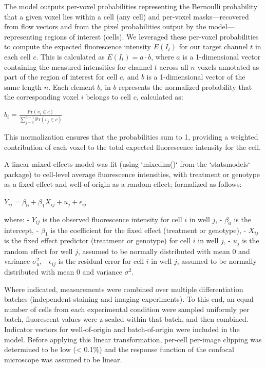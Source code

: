 \documentclass[12pt]{article}
\begin{document}
The model outputs per-voxel probabilities representing the Bernoulli probability that a given voxel lies within a cell (any cell) and per-voxel masks—recovered from flow vectors and from the pixel probabilities output by the model—representing regions of interest (cells). We leveraged these per-voxel probabilities to compute the expected fluorescence intensity $E(I_t)$ for our target channel $t$ in each cell $c$. This is calculated as $E(I_t) = a \cdot b$, where $a$ is a 1-dimensional vector containing the measured intensities for channel $t$ across all $n$ voxels annotated as part of the region of interest for cell $c$, and $b$ is a 1-dimensional vector of the same length $n$. Each element $b_i$ in $b$ represents the normalized probability that the corresponding voxel $i$ belongs to cell $c$, calculated as:

$b_i = \frac{\text{Pr}(v_i \in c)}{\sum_{j=0}^{n-1} \text{Pr}(v_j \in c)}$

This normalization ensures that the probabilities sum to 1, providing a weighted contribution of each voxel to the total expected fluorescence intensity for the cell.

A linear mixed-effects model was fit (using `mixedlm()` from the `statsmodels` package) to cell-level average fluorescence intensities, with treatment or genotype as a fixed effect and well-of-origin as a random effect; formalized as follows:

$ Y_{ij} = \beta_0 + \beta_1 X_{ij} + u_j + \epsilon_{ij} $

where:
- $Y_{ij}$ is the observed fluorescence intensity for cell $i$ in well $j$,
- $\beta_0$ is the intercept,
- $\beta_1$ is the coefficient for the fixed effect (treatment or genotype),
- $X_{ij}$ is the fixed effect predictor (treatment or genotype) for cell $i$ in well $j$,
- $u_j$ is the random effect for well $j$, assumed to be normally distributed with mean 0 and variance $\sigma_u^2$,
- $\epsilon_{ij}$ is the residual error for cell $i$ in well $j$, assumed to be normally distributed with mean 0 and variance $\sigma^2$.

Where indicated, measurements were combined over multiple differentiation batches (independent staining and imaging experiments). To this end, an equal number of cells from each experimental condition were sampled uniformly per batch, fluorescent values were z-scaled within that batch, and then combined. Indicator vectors for well-of-origin and batch-of-origin were included in the model. Before applying this linear transformation, per-cell per-image clipping was determined to be low (< 0.1\%) and the response function of the confocal microscope was assumed to be linear.
\end{document}
